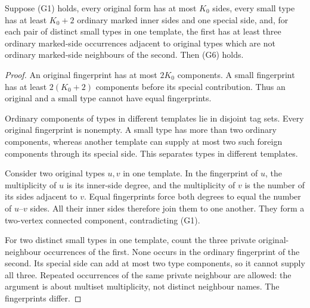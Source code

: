 \begin{lemma}
\label{lem:fingerprint}
Suppose (G1) holds, every original form has at most $K_0$ sides, every small
type has at least $K_0+2$ ordinary marked inner sides and one special side,
and, for each pair of distinct small types in one template, the first has
at least three ordinary marked-side occurrences adjacent to original
types which are not ordinary marked-side neighbours of the second.
Then (G6) holds.
\end{lemma}

\begin{proof}
An original fingerprint has at most $2K_0$ components.  A small fingerprint
has at least $2(K_0+2)$ components before its special contribution.  Thus
an original and a small type cannot have equal fingerprints.

Ordinary components of types in different templates lie in disjoint tag
sets.  Every original fingerprint is nonempty.  A small type has more
than two ordinary components, whereas another template can supply at most
two such foreign components through its special side.  This separates
types in different templates.

Consider two original types $u,v$ in one template.  In the fingerprint of
$u$, the multiplicity of $u$ is its inner-side degree, and the multiplicity
of $v$ is the number of its sides adjacent to $v$.  Equal fingerprints
force both degrees to equal the number of $u$--$v$ sides.  All their inner
sides therefore join them to one another.  They form a two-vertex connected
component, contradicting (G1).

For two distinct small types in one template, count the three private
original-neighbour occurrences of the first.  None occurs in the ordinary
fingerprint of the second.  Its special side can add at most two type
components, so it cannot supply all three.  Repeated occurrences of the
same private neighbour are allowed: the argument is about multiset
multiplicity, not distinct neighbour names.  The fingerprints differ.
\end{proof}

